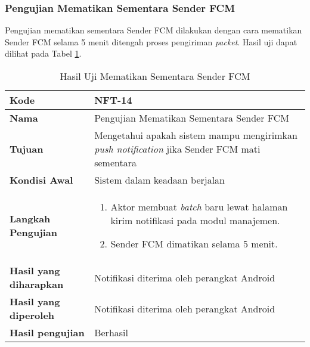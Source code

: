 \subsubsection{Pengujian Mematikan Sementara Sender FCM}
\par Pengujian mematikan sementara Sender FCM dilakukan dengan cara mematikan Sender FCM selama 5 menit ditengah proses pengiriman \textit{packet}. Hasil uji dapat dilihat pada Tabel \ref{t:nft_sender_fcm_mati}.
\begin{longtable}{|p{3cm}|p{6.5cm}|}
	\caption{Hasil Uji Mematikan Sementara Sender FCM} \label{t:nft_sender_fcm_mati} \\ \hline
	\textbf{Kode} & NFT-14 \\ \hline
	\textbf{Nama} & Pengujian Mematikan Sementara Sender FCM \\ \hline
	\textbf{Tujuan} & Mengetahui apakah sistem mampu mengirimkan \textit{push notification} jika Sender FCM mati sementara \\ \hline
	\textbf{Kondisi Awal} & Sistem dalam keadaan berjalan \\ \hline
	\textbf{Langkah Pengujian} &  
	\begin{enumerate}
		\item Aktor membuat \textit{batch} baru lewat halaman kirim notifikasi pada modul manajemen.
		\item Sender FCM dimatikan selama 5 menit.
	\end{enumerate} \\ \hline
	\textbf{Hasil yang diharapkan} & Notifikasi diterima oleh perangkat Android \\ \hline
	\textbf{Hasil yang diperoleh} & Notifikasi diterima oleh perangkat Android \\ \hline
	\textbf{Hasil pengujian} & Berhasil \\ \hline
\end{longtable}

